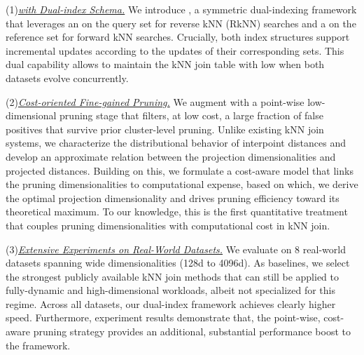 \noindent(1)\underline{\emph{\fdknnj with Dual-index Schema.}}
   We introduce \dualtree, a symmetric dual-indexing framework that leverages an \hdrtree on the query set for reverse kNN (RkNN) searches and a \deltatree on the reference set for forward kNN searches. Crucially, both index structures support incremental updates according to the updates of their corresponding sets. This dual capability allows \dualtree to maintain the kNN join table with low when both datasets evolve concurrently.


\noindent(2)\underline{\emph{Cost-oriented Fine-gained Pruning.}}
    We augment \dualtree with a point-wise low-dimensional pruning stage that filters, at low cost, a large fraction of false positives that survive prior cluster-level pruning. Unlike existing kNN join systems, we characterize the distributional behavior of interpoint distances and develop an approximate relation between the projection dimensionalities and projected distances. Building on this, we formulate a cost-aware model that links the pruning dimensionalities to computational expense, based on which, we derive the optimal projection dimensionality and drives pruning efficiency toward its theoretical maximum. To our knowledge, this is the first quantitative treatment that couples pruning dimensionalities with computational cost in kNN join.
    

\noindent(3)\underline{\emph{Extensive Experiments on Real-World Datasets.}}
   We evaluate on 8 real-world datasets spanning wide dimensionalities (128d to 4096d). As baselines, we select the strongest publicly available kNN join methods that can still be applied to fully-dynamic and high-dimen\-sional workloads, albeit not specialized for this regime. Across all datasets, our dual-index framework achieves clearly higher speed. Furthermore, experiment results demonstrate that, the point-wise, cost-aware pruning strategy provides an additional, substantial performance boost to the \dualtree framework.
    



